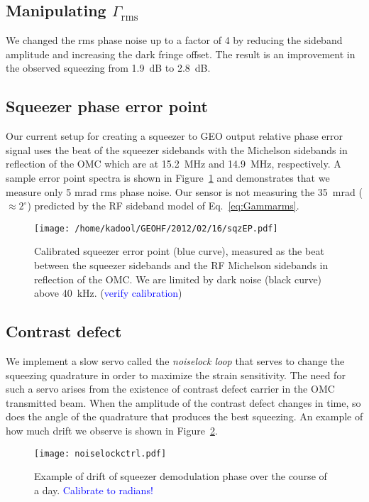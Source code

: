 \documentclass{ligodoc}
\begin{document}
\subsection{Manipulating $\Gamma_{\mathrm{rms}}$}
We changed the rms phase noise up to a factor of 4 by reducing the
sideband amplitude and increasing the dark fringe offset. The result
is an improvement in the observed squeezing from 1.9~dB to 2.8~dB.




\subsection{Squeezer phase error point}
Our current setup for creating a squeezer to GEO output relative phase
error signal uses the beat of the squeezer sidebands with the
Michelson sidebands in reflection of the OMC which are at 15.2~MHz and
14.9~MHz, respectively. A sample error point spectra is shown in
Figure~\ref{fig:sqzEP} and demonstrates that we measure only 5 mrad
rms phase noise. Our sensor is not measuring the 35~mrad ($\approx
2^\circ$) predicted by the RF sideband model of Eq.~\ref{eq:Gammarms}.

\begin{figure}
\begin{centering}
\texttt{[image: /home/kadool/GEOHF/2012/02/16/sqzEP.pdf]}
\caption{Calibrated squeezer error point (blue curve), measured as the
  beat between the squeezer sidebands and the RF Michelson sidebands
  in reflection of the OMC. We are limited by dark noise (black curve)
  above 40~kHz. (\textcolor{blue}{verify calibration})}
\label{fig:sqzEP}
\end{centering}
\end{figure}



\subsection{Contrast defect}
We implement a slow servo called the \emph{noiselock loop} that serves
to change the squeezing quadrature in order to maximize the strain
sensitivity. The need for such a servo arises from the existence of
contrast defect carrier in the OMC transmitted beam. When the
amplitude of the contrast defect changes in time, so does the angle of
the quadrature that produces the best squeezing. An example of how
much drift we observe is shown in Figure~\ref{fig:noiselock}. 

\begin{figure}
\begin{centering}
\texttt{[image: noiselockctrl.pdf]}
\caption{Example of drift of squeezer demodulation phase over the
  course of a day. \textcolor{blue}{Calibrate to radians!}}
\label{fig:noiselock}
\end{centering}
\end{figure}
\end{document}
